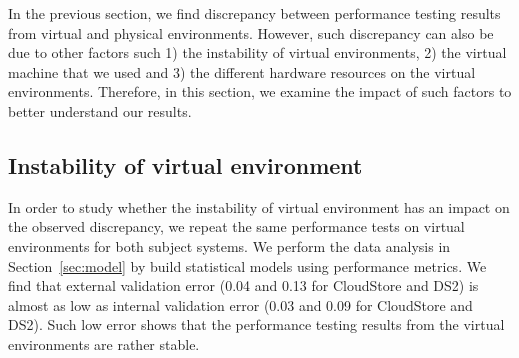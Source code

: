 In the previous section, we find discrepancy between performance testing results from virtual and physical environments. However, such discrepancy can also be due to other factors such 1) the instability of virtual environments, 2) the virtual machine that we used and 3) the different hardware resources on the virtual environments. Therefore, in this section, we examine the impact of such factors to better understand our results. 


\subsection{Instability of virtual environment}

In order to study whether the instability of virtual environment has an impact on the observed discrepancy, we repeat the same performance tests on virtual environments for both subject systems. We perform the data analysis in Section~\ref{sec:model} by build statistical models using performance metrics. %
We find that external validation error (0.04 and 0.13 for CloudStore and DS2) is almost as low as internal validation error (0.03 and 0.09 for CloudStore and DS2). Such low error shows that the performance testing results from the virtual environments are rather stable. 


